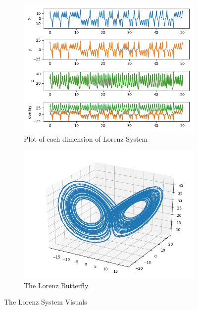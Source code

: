 \documentclass{article}
\begin{document}
\begin{figure}[H]
    \centering
    \begin{subfigure}[b]{0.6\textwidth}
        \includegraphics[width=\textwidth]{images/lorenz_nd_plot.png}
        \caption{Plot of each dimension of Lorenz System}
        \label{fig:lorenz_nd}
    \end{subfigure}
    \begin{subfigure}[b]{0.6\textwidth}
        \includegraphics[width=\textwidth]{images/lorenz_3d_plot.png}
        \caption{The Lorenz Butterfly}
        \label{fig:lorenz_3d}
    \end{subfigure}
    \caption{The Lorenz System Visuals}
    \label{fig:lorenz_butter}
\end{figure}
\end{document}
